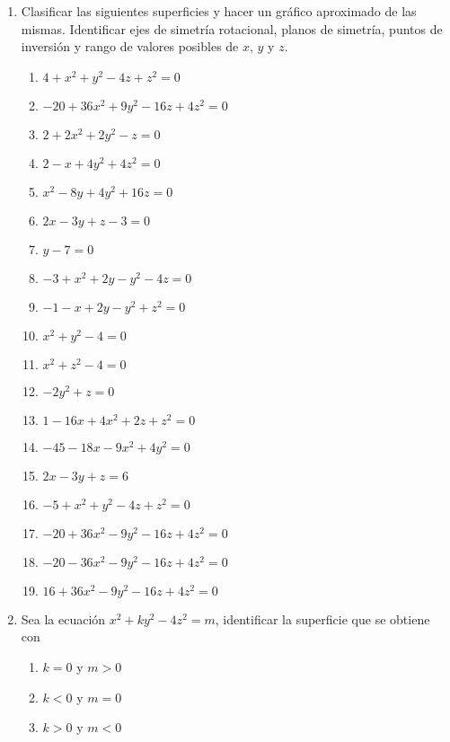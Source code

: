 \documentclass[a4paper]{article}
\newcommand{\exercise}{\item}
\begin{document}
\begin{enumerate}
\begin{multicols}{2}
\begin{enumerate} [label=(\alph*)]
	\end{enumerate}
	\end{multicols}

	\exercise Clasificar las siguientes superficies y hacer un gráfico aproximado de las mismas. Identificar ejes de simetría rotacional, planos de simetría, puntos de inversión y rango de valores posibles de $x$, $y$ y $z$.
	\begin{multicols}{2}
	\begin{enumerate} [label=(\alph*)]
		
		\item $4+x^2+y^2-4z+z^2=0$
		\item $-20+36x^2+9y^2-16z+4z^2=0$
		\item $2+2x^2+2y^2-z=0$
		\item $2-x+4y^2+4z^2=0$
		\item $x^2-8y+4y^2+16z=0$
		\item $2x-3y+z-3=0$
		\item $y-7=0$
		\item $-3+x^2+2y-y^2-4z=0$
		\item $-1-x+2y-y^2+z^2=0$
		\item $x^2+y^2-4=0$
		\item $x^2+z^2-4=0$
		\item $-2y^2+z=0$
		\item $1-16x+4x^2+2z+z^2=0$
		\item $-45-18x-9x^2+4y^2=0$
		\item $2x-3y+z=6$
		\item $-5+x^2+y^2-4z+z^2=0$
		\item $-20+36x^2-9y^2-16z+4z^2=0$
		\item $-20-36x^2-9y^2-16z+4z^2=0$
		\item $16+36x^2-9y^2-16z+4z^2=0$

	\end{enumerate}
	\end{multicols}


	\exercise Sea la ecuación $x^2+ky^2-4z^2=m$, identificar la superficie que se obtiene con
	\begin{multicols}{2}
	\begin{enumerate} [label=(\alph*)]
		
		\item $k=0$ y $m>0$
		\item $k<0$ y $m=0$
		\item $k>0$ y $m<0$

	\end{enumerate}
	\end{multicols}



\end{enumerate}
\end{document}
